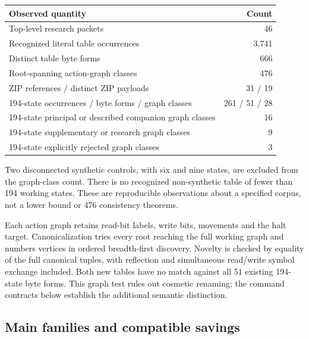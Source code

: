 \documentclass[11pt,letterpaper]{article}
\begin{document}
\begin{center}
\begin{tabular}{@{}lr@{}}\toprule
Observed quantity & Count\\\midrule
Top-level research packets &46\\
Recognized literal table occurrences &3,741\\
Distinct table byte forms &666\\
Root-spanning action-graph classes &476\\
ZIP references / distinct ZIP payloads &31 / 19\\
194-state occurrences / byte forms / graph classes &261 / 51 / 28\\
194-state principal or described companion graph classes &16\\
194-state supplementary or research graph classes &9\\
194-state explicitly rejected graph classes &3\\\bottomrule
\end{tabular}
\end{center}
Two disconnected synthetic controls, with six and nine states, are excluded
from the graph-class count. There is no recognized non-synthetic table of
fewer than 194 working states. These are reproducible observations about a
specified corpus, not a lower bound or 476 consistency theorems.

Each action graph retains read-bit labels, write bits, movements and the
halt target. Canonicalization tries every root reaching the full working
graph and numbers vertices in ordered breadth-first discovery. Novelty is
checked by equality of the full canonical tuples, with reflection and
simultaneous read/write symbol exchange included. Both new tables have no
match against all 51 existing 194-state byte forms. This graph test rules
out cosmetic renaming; the command contracts below establish the additional
semantic distinction.

\subsection{Main families and compatible savings}
\end{document}
